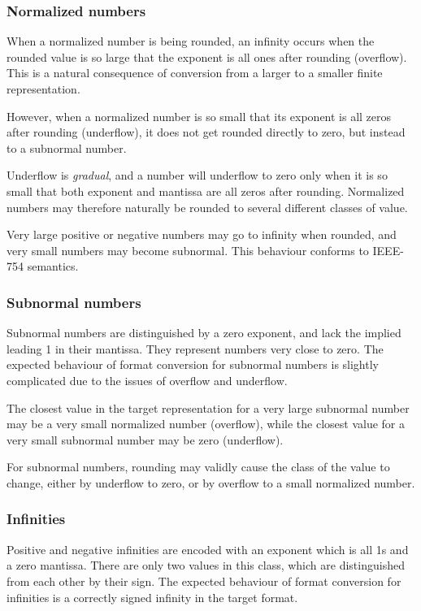\documentclass{sig-alternate-05-2015}
\begin{document}
\subsubsection{Normalized numbers}

When a normalized number is being rounded, an infinity occurs when the
rounded value is so large that the exponent is all ones after rounding
(overflow). This is a natural consequence of conversion from a larger to a
smaller finite representation.

However, when a normalized number is so small that its exponent is all zeros
after rounding (underflow), it does not get rounded directly to zero, but
instead to a subnormal number.

Underflow is \emph{gradual}, and a number will underflow to zero only when it
is so small that both exponent and mantissa are all zeros after rounding.
Normalized numbers may therefore naturally be rounded to several different
classes of value.

Very large positive or negative numbers may go to infinity when rounded, and
very small numbers may become subnormal. This behaviour conforms to IEEE-754
semantics.

\subsubsection{Subnormal numbers}

Subnormal numbers are distinguished by a zero exponent, and lack the implied
leading 1 in their mantissa. They represent numbers very close to zero. The
expected behaviour of format conversion for subnormal numbers is slightly
complicated due to the issues of overflow and underflow.

The closest value in the target representation for a very large subnormal
number may be a very small normalized number (overflow), while the closest
value for a very small subnormal number may be zero (underflow).

For subnormal numbers, rounding may validly cause the class of the value to
change, either by underflow to zero, or by overflow to a small normalized
number.

\eject
\subsubsection{Infinities}

Positive and negative infinities are encoded with an exponent which is all 1s
and a zero mantissa. There are only two values in this class, which are
distinguished from each other by their sign. The expected behaviour of format
conversion for infinities is a correctly signed infinity in the target format.
\end{document}
